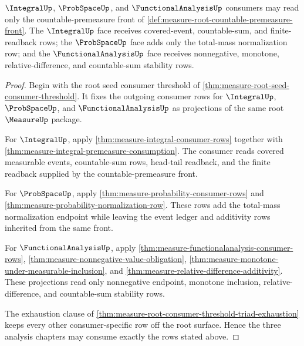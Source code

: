 \begin{theorem}
\label{thm:measure-root-countable-premeasure-consumer-threshold}
$\IntegralUp$, $\ProbSpaceUp$, and $\FunctionalAnalysisUp$ consumers may read
only the countable-premeasure front of
\autoref{def:measure-root-countable-premeasure-front}. The $\IntegralUp$ face
receives covered-event, countable-sum, and finite-readback rows; the
$\ProbSpaceUp$ face adds only the total-mass normalization row; and the
$\FunctionalAnalysisUp$ face receives nonnegative, monotone,
relative-difference, and countable-sum stability rows.
\end{theorem}
\begin{proof}
Begin with the root seed consumer threshold of
\autoref{thm:measure-root-seed-consumer-threshold}. It fixes the outgoing
consumer rows for $\IntegralUp$, $\ProbSpaceUp$, and
$\FunctionalAnalysisUp$ as projections of the same root $\MeasureUp$ package.

For $\IntegralUp$, apply \autoref{thm:measure-integral-consumer-rows} together
with \autoref{thm:measure-integral-premeasure-consumption}. The consumer reads
covered measurable events, countable-sum rows, head-tail readback, and the
finite readback supplied by the countable-premeasure front.

For $\ProbSpaceUp$, apply \autoref{thm:measure-probability-consumer-rows} and
\autoref{thm:measure-probability-normalization-row}. These rows add the
total-mass normalization endpoint while leaving the event ledger and
additivity rows inherited from the same front.

For $\FunctionalAnalysisUp$, apply
\autoref{thm:measure-functionalanalysis-consumer-rows},
\autoref{thm:measure-nonnegative-value-obligation},
\autoref{thm:measure-monotone-under-measurable-inclusion}, and
\autoref{thm:measure-relative-difference-additivity}. These projections read
only nonnegative endpoint, monotone inclusion, relative-difference, and
countable-sum stability rows.

The exhaustion clause of
\autoref{thm:measure-root-consumer-threshold-triad-exhaustion} keeps every
other consumer-specific row off the root surface. Hence the three analysis
chapters may consume exactly the rows stated above.
\end{proof}
